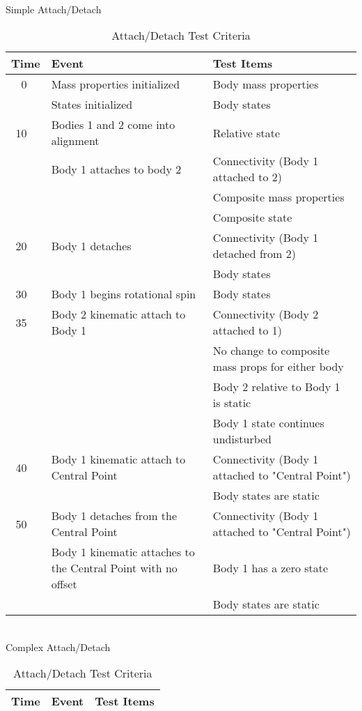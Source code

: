 \begin{table}[htp]
\centering
\caption{Attach/Detach Test Criteria}
\label{tab:attach_detach_criteria}
\ \\[2ex]Simple Attach/Detach \\[6pt]
\begin{tabular}{||r@{}l|p{2.4in}|p{2.7in}|} \hline
\multicolumn{2}{||l|}{\bf Time}
  & {\bf Event} & {\bf Test Items} \\ \hline \hline
0 && Mass properties initialized & Body mass properties \\
 && States initialized & Body states \\[6pt]
10 && Bodies 1 and 2 come into alignment & Relative state \\
 && Body 1 attaches to body 2 & Connectivity (Body 1 attached to 2) \\
 &&& Composite mass properties \\
 &&& Composite state \\[6pt]
20 && Body 1 detaches & Connectivity (Body 1 detached from 2) \\
 &&& Body states \\[6pt]
30 && Body 1 begins rotational spin & Body states \\[6pt]
35 && Body 2 kinematic attach to Body 1 & Connectivity (Body 2 attached to 1) \\
 &&& No change to composite mass props for either body \\
 &&& Body 2 relative to Body 1 is static \\
 &&& Body 1 state continues undisturbed \\[6pt]
40 && Body 1 kinematic attach to Central Point & Connectivity (Body 1 attached to "Central Point") \\
   &&& Body states are static \\[6pt]
50 && Body 1 detaches from the Central Point & Connectivity (Body 1 attached to "Central Point") \\
   && Body 1 kinematic attaches to the Central Point with no offset & Body 1 has a zero state \\
   &&& Body states are static \\
\hline
\end{tabular}
 \ \\[4ex]Complex Attach/Detach \\[6pt]
\begin{tabular}{||r@{}l|p{2.4in}|p{2.7in}|} \hline
\multicolumn{2}{||l|}{\bf Time}
  & {\bf Event} & {\bf Test Items} \\ \hline \hline

\end{tabular}
\end{table}
